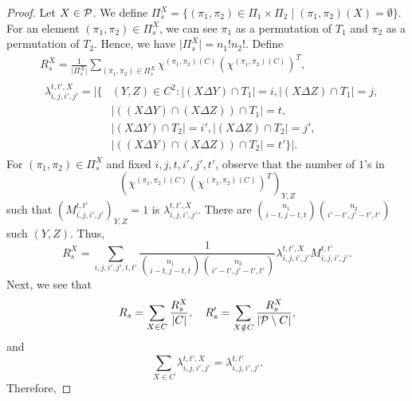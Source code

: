 \documentclass[final,onecolumn]{IEEEtran}
\theoremstyle{definition}
\begin{document}
\begin{proof}
	Let $X \in {\cal P}$. We define $\Pi_{s}^{X} = \{(\pi_{1}, \pi_{2}) \in \Pi_{1} \times \Pi_{2} \mid (\pi_{1}, \pi_{2})(X) = \emptyset\}$. For an element $(\pi_{1}, \pi_{2}) \in \Pi_{s}^{X}$, we can see $\pi_{1}$ as a permutation of $T_{1}$ and $\pi_{2}$ as a permutation of $T_{2}$. Hence, we have $\lvert \Pi_{s}^{X}\rvert = n_{1} ! n_{2} !$. Define
	\begin{align*}
		& R_{s}^{X} = \frac{1}{\lvert \Pi_{s}^{X} \rvert} \sum_{(\pi_{1}, \pi_{2}) \in \Pi_{s}^{X}} \chi^{(\pi_{1}, \pi_{2})(C)} (\chi^{(\pi_{1}, \pi_{2})(C)})^{T}, \\
		&
		\begin{aligned}
			\lambda^{t, t', X}_{i, j, i', j'} = \lvert\{&(Y, Z) \in C^{2} : \lvert(X \Delta Y)\cap T_{1}\rvert = i, \lvert(X \Delta Z)\cap T_{1}\rvert = j,\\ 
			&\lvert((X \Delta Y)\cap (X \Delta Z))\cap T_{1}\rvert = t,\\
			&\lvert(X \Delta Y)\cap T_{2}\rvert = i', \lvert(X \Delta Z)\cap T_{2}\rvert = j',\\
			&\lvert((X \Delta Y)\cap (X \Delta Z))\cap T_{2}\rvert = t' \}\rvert.
		\end{aligned}
	\end{align*}
	For $(\pi_{1}, \pi_{2}) \in \Pi_{s}^{X}$ and fixed $i, j, t, i', j', t'$, observe that the number of $1$'s in 
	\begin{equation*}
		(\chi^{(\pi_{1}, \pi_{2})(C)} (\chi^{(\pi_{1}, \pi_{2})(C)})^{T})_{Y, Z}
	\end{equation*} 
	such that $(M_{i, j, i', j'}^{t, t'})_{Y, Z} = 1$ is $\lambda^{t, t', X}_{i, j, i', j'}$. There are $\binom{n_{1}}{i-t, j-t, t} \binom{n_{2}}{i'-t', j'-t', t'}$ such $(Y, Z)$. Thus,
	\begin{equation*}
		R_{s}^{X} = \sum_{i, j, i', j', t, t'} \frac{1}{\binom{n_{1}}{i-t, j-t, t} \binom{n_{2}}{i'-t', j'-t', t'}} \lambda^{t, t', X}_{i, j, i', j'} M_{i, j, i', j'}^{t, t'}.
	\end{equation*}
	Next, we see that
	\begin{equation*}
		R_{s} = \sum_{X \in C} \frac{R_{s}^{X}}{\lvert C\rvert}, \quad R_{s}' = \sum_{X \notin C} \frac{R_{s}^{X}}{\lvert {\cal P} \setminus C \rvert},
	\end{equation*}
	and
	\begin{equation*}
		\sum_{X \in C} \lambda^{t, t', X}_{i, j, i', j'} = \lambda^{t, t'}_{i, j, i', j'}.
	\end{equation*}
	Therefore, 

\end{proof}
\end{document}
